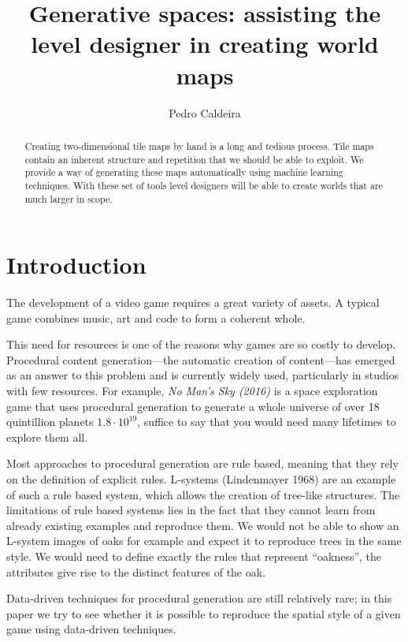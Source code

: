 \documentclass[A4paper,]{article}
\title{Generative spaces: assisting the level designer in creating world maps}
\author{Pedro Caldeira}
\date{}
\begin{document}
\maketitle
\begin{abstract}
Creating two-dimensional tile maps by hand is a long and tedious
process. Tile maps contain an inherent structure and repetition that we
should be able to exploit. We provide a way of generating these maps
automatically using machine learning techniques. With these set of tools
level designers will be able to create worlds that are much larger in
scope.
\end{abstract}

\section{Introduction}\label{introduction}

The development of a video game requires a great variety of assets. A
typical game combines music, art and code to form a coherent whole.

This need for resources is one of the reasons why games are so costly to
develop. Procedural content generation---the automatic creation of
content---has emerged as an answer to this problem and is currently
widely used, particularly in studios with few resources. For example,
\emph{No Man's Sky (2016)} is a space exploration game that uses
procedural generation to generate a whole universe of over 18
quintillion planets \(1.8 \cdot 10^{19}\), suffice to say that you would
need many lifetimes to explore them all.

Most approaches to procedural generation are rule based, meaning that
they rely on the definition of explicit rules. L-systems (Lindenmayer
1968) are an example of such a rule based system, which allows the
creation of tree-like structures. The limitations of rule based systems
lies in the fact that they cannot learn from already existing examples
and reproduce them. We would not be able to show an L-system images of
oaks for example and expect it to reproduce trees in the same style. We
would need to define exactly the rules that represent ``oakness'', the
attributes give rise to the distinct features of the oak.

Data-driven techniques for procedural generation are still relatively
rare; in this paper we try to see whether it is possible to reproduce
the spatial style of a given game using data-driven techniques.
\end{document}
